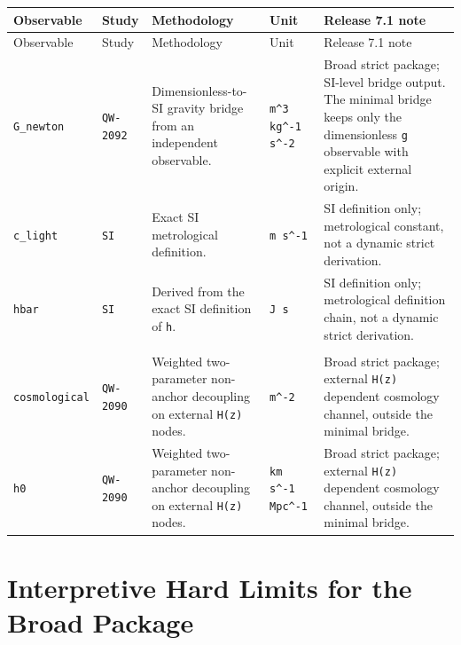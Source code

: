 \small
\begin{longtable}{@{}p{2.6cm}p{1.4cm}p{4.8cm}p{1.7cm}p{4.5cm}@{}}
\toprule
Observable & Study & Methodology & Unit & Release 7.1 note \\
\midrule
\endfirsthead
\toprule
Observable & Study & Methodology & Unit & Release 7.1 note \\
\midrule
\endhead
\texttt{G\_newton} & \texttt{QW-2092} & Dimensionless-to-SI gravity bridge from an independent observable. & \texttt{m\textasciicircum{}3 kg\textasciicircum{}-1 s\textasciicircum{}-2} & Broad strict package; SI-level bridge output. The minimal bridge keeps only the dimensionless \texttt{g} observable with explicit external origin. \\
\texttt{c\_light} & \texttt{SI} & Exact SI metrological definition. & \texttt{m s\textasciicircum{}-1} & SI definition only; metrological constant, not a dynamic strict derivation. \\
\texttt{hbar} & \texttt{SI} & Derived from the exact SI definition of \texttt{h}. & \texttt{J s} & SI definition only; metrological definition chain, not a dynamic strict derivation. \\
\shortstack[l]{\texttt{lambda\_}\\\texttt{cosmological}} & \texttt{QW-2090} & Weighted two-parameter non-anchor decoupling on external \texttt{H(z)} nodes. & \texttt{m\textasciicircum{}-2} & Broad strict package; external \texttt{H(z)} dependent cosmology channel, outside the minimal bridge. \\
\texttt{h0} & \texttt{QW-2090} & Weighted two-parameter non-anchor decoupling on external \texttt{H(z)} nodes. & \texttt{km s\textasciicircum{}-1 Mpc\textasciicircum{}-1} & Broad strict package; external \texttt{H(z)} dependent cosmology channel, outside the minimal bridge. \\
\bottomrule
\end{longtable}
\normalsize
\let\dimlessunit\undefined

\section{Interpretive Hard Limits for the Broad Package}


